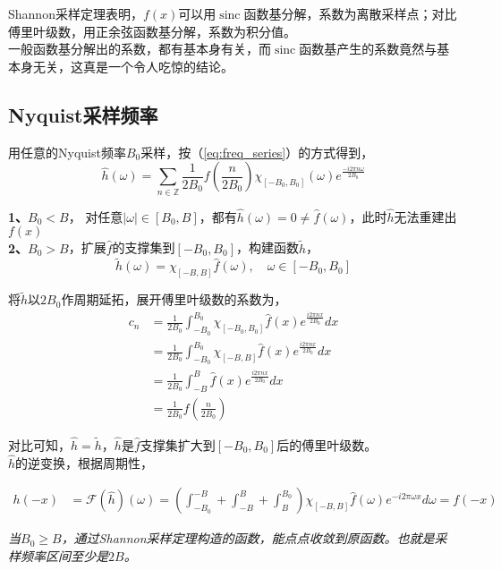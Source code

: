 	Shannon采样定理表明，$f(x)$可以用$\mathop{sinc}$函数基分解，系数为离散采样点；对比傅里叶级数，用正余弦函数基分解，系数为积分值。\\

	一般函数基分解出的系数，都有基本身有关，而$\mathop{sinc}$函数基产生的系数竟然与基本身无关，这真是一个令人吃惊的结论。

\subsection{Nyquist采样频率}
	
	用任意的Nyquist频率$B_0$采样，按（\ref{eq:freq_series}）的方式得到，
	$$
		\hat{h}(\omega) = \sum_{n \in \mathbb{Z}}\frac{1}{2B_0}f\left(\frac{n}{2B_0}\right)
		\chi_{[-B_0,B_0]}(\omega)
		e^{\frac{-i2\pi  n \omega}{2B_0}}
	$$

	\textbf{1、$B_0 < B$}， 对任意$|\omega| \in [B_0,B]$，都有$\hat{h}(\omega) =0 \ne \hat{f}(\omega)$，此时$\hat{h}$无法重建出$f(x)$\\

	\textbf{2、$B_0 > B$}，扩展$\hat{f}$的支撑集到$[-B_0,B_0]$，构建函数$\tilde{h}$，
	$$
		\tilde{h}(\omega) = \chi_{[-B,B]}\hat{f}(\omega), \quad\omega \in [-B_0, B_0] 
	$$

	将$\tilde{h}$以$2B_0$作周期延拓，展开傅里叶级数的系数为，
	\begin{align*}
		c_n
			&= \frac{1}{2B_0}\int_{-B_0}^{B_0} \chi_{[-B_0,B_0]}\hat{f}(x) e^{\frac{i2\pi nx}{2B_0}}dx\\
			&= \frac{1}{2B_0}\int_{-B_0}^{B_0} \chi_{[-B,B]}\hat{f}(x) e^{\frac{i2\pi nx}{2B_0}}dx\\
			&= \frac{1}{2B_0}\int_{-B}^{B} \hat{f}(x) e^{\frac{i2\pi nx}{2B_0}}dx\\
			&= \frac{1}{2B_0}f\left(\frac{n}{2B_0}\right)
	\end{align*}

	对比可知，$\hat{h} = \tilde{h}$，$\hat{h}$是$\hat{f}$支撑集扩大到$[-B_0,B_0]$后的傅里叶级数。\\

	$\hat{h}$的逆变换，根据周期性，

	\begin{align*}
		h(-x) &= \mathcal{F}(\hat{h})(\omega) 
			= \left(\int_{-B_0}^{-B} + \int_{-B}^{B} + \int_{B}^{B_0} \right)
			\chi_{[-B,B]}\hat{f}(\omega) e^{-i2\pi \omega x}d\omega
			 = f(-x)
	\end{align*}
	
	\textit{当$B_0\ge B$，通过Shannon采样定理构造的函数，能点点收敛到原函数。也就是采样频率区间至少是$2B$。}\\

